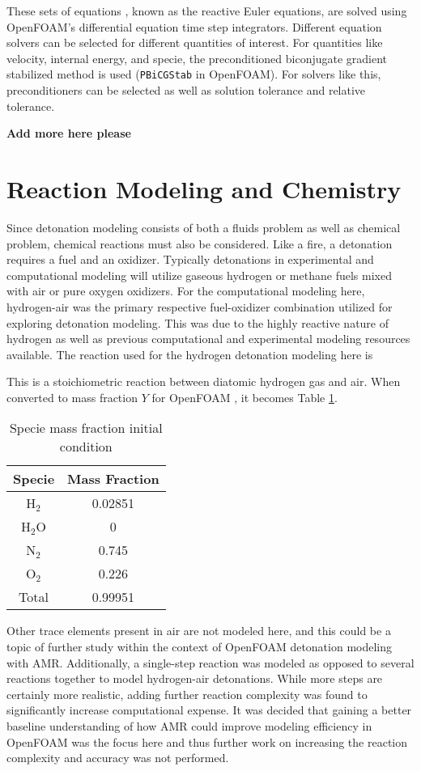 These sets of equations \cite{kuo}, known as the reactive Euler equations, are solved using OpenFOAM's differential equation time step integrators. Different equation solvers can be selected for different quantities of interest. For quantities like velocity, internal energy, and specie, the preconditioned biconjugate gradient stabilized method is used (\verb|PBiCGStab| in OpenFOAM). For solvers like this, preconditioners can be selected as well as solution tolerance and relative tolerance. 

\textbf{\color{red} Add more here please}


\section{Reaction Modeling and Chemistry}
Since detonation modeling consists of both a fluids problem as well as chemical problem, chemical reactions must also be considered. Like a fire, a detonation requires a fuel and an oxidizer. Typically detonations in experimental and computational modeling will utilize gaseous hydrogen or methane fuels mixed with air or pure oxygen oxidizers. For the computational modeling here, hydrogen-air was the primary respective fuel-oxidizer combination utilized for exploring detonation modeling. This was due to the highly reactive nature of hydrogen as well as previous computational and experimental modeling resources available. The reaction used for the hydrogen detonation modeling here is
\begin{center}
\end{center}
This is a stoichiometric reaction between diatomic hydrogen gas and air. When converted to mass fraction \(Y\) for OpenFOAM \cite{marcantoni}, it becomes Table \ref{tab:y}.
\begin{table}[H]
\centering
\caption{Specie mass fraction initial condition}
\label{tab:y}
\begin{tabular}{cc}
Specie & Mass Fraction \\ \hline
H\(_2\) & 0.02851 \\ 
H\(_2\)O & 0 \\
N\(_2\) & 0.745 \\ 
O\(_2\) & 0.226 \\ 
Total & 0.99951 \\ 
\end{tabular}
\end{table}

Other trace elements present in air are not modeled here, and this could be a topic of further study within the context of OpenFOAM detonation modeling with AMR. Additionally, a single-step reaction was modeled as opposed to several reactions together to model hydrogen-air detonations. While more steps are certainly more realistic, adding further reaction complexity was found to significantly increase computational expense. It was decided that gaining a better baseline understanding of how AMR could improve modeling efficiency in OpenFOAM was the focus here and thus further work on increasing the reaction complexity and accuracy was not performed. 

